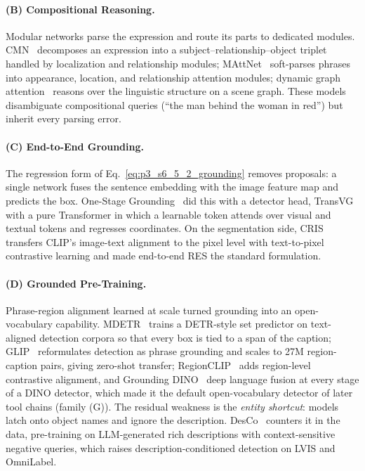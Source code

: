 \paragraph{(B) Compositional Reasoning.}
Modular networks parse the expression and route its parts to dedicated modules. CMN~\cite{hu2017modeling} decomposes an expression into a subject--relationship--object triplet handled by localization and relationship modules; MAttNet~\cite{yu2018mattnet} soft-parses phrases into appearance, location, and relationship attention modules; dynamic graph attention~\cite{yang2019dynamic} reasons over the linguistic structure on a scene graph. These models disambiguate compositional queries (``the man behind the woman in red'') but inherit every parsing error.

\paragraph{(C) End-to-End Grounding.}
The regression form of Eq.~\eqref{eq:p3_s6_5_2_grounding} removes proposals: a single network fuses the sentence embedding with the image feature map and predicts the box. One-Stage Grounding~\cite{yang2019fast} did this with a detector head, TransVG~\cite{deng2021transvg} with a pure Transformer in which a learnable token attends over visual and textual tokens and regresses coordinates. On the segmentation side, CRIS~\cite{wang2022cris} transfers CLIP's image-text alignment to the pixel level with text-to-pixel contrastive learning and made end-to-end RES the standard formulation.

\paragraph{(D) Grounded Pre-Training.}
Phrase-region alignment learned at scale turned grounding into an open-vocabulary capability. MDETR~\cite{kamath2021mdetr} trains a DETR-style set predictor on text-aligned detection corpora so that every box is tied to a span of the caption; GLIP~\cite{li2022grounded} reformulates detection as phrase grounding and scales to 27M region-caption pairs, giving zero-shot transfer; RegionCLIP~\cite{zhong2022regionclip} adds region-level contrastive alignment, and Grounding DINO~\cite{liu2024grounding} deep language fusion at every stage of a DINO detector, which made it the default open-vocabulary detector of later tool chains (family (G)). The residual weakness is the \emph{entity shortcut}: models latch onto object names and ignore the description. DesCo~\cite{li2023desco} counters it in the data, pre-training on LLM-generated rich descriptions with context-sensitive negative queries, which raises description-conditioned detection on LVIS and OmniLabel.

